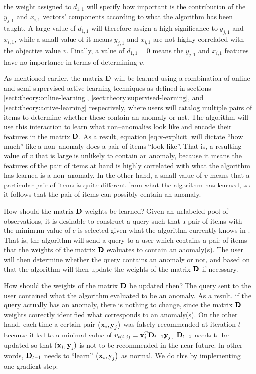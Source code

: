 the weight assigned to $d_{1,1}$ will specify how important is the contribution of the $y_{j,1}$ and $x_{i,1}$ vectors' components according to what the \mlblink algorithm has been taught. A large value of $d_{1,1}$ will therefore assign a high significance to $y_{j,1}$ and $x_{i,1}$, while a small value of it means $y_{j,1}$ and $x_{i,1}$ are not highly correlated with the objective value $v$. Finally, a value of $d_{1,1} = 0$ means the $y_{j,1}$ and $x_{i,1}$ features have no importance in terms of determining $v$.  \newline

As mentioned earlier, the matrix $\boldsymbol{\mathbf{D}}$ will be learned using a combination of online and semi-supervised active learning techniques as defined in sections \ref{sect:theory:online-learning}, \ref{sect:theory:supervised-learning}, and \ref{sect:theory:active-learning} respectively, where users will catalog multiple pairs of items to determine whether these contain an anomaly or not. The \mlblink algorithm will use this interaction to learn what non--anomalies look like and encode their features in the matrix $\boldsymbol{\mathbf{D}}$. As a result, equation \ref{eq:v-explicit} will dictate ``how much'' like a non--anomaly does a pair of items ``look like''. That is, a resulting value of $v$ that is large is unlikely to contain an anomaly, because it means the features of the pair of items at hand is highly correlated with what the \mlblink algorithm has learned is a non--anomaly. In the other hand, a small value of $v$ means that a particular pair of items is quite different from what the \mlblink algorithm has learned, so it follows that the pair of items can possibly contain an anomaly.  \newline

How should the matrix $\boldsymbol{\mathbf{D}}$ weights be learned? Given an unlabeled pool of observations, it is desirable to construct a query such that a pair of items with the minimum value of $v$ is selected given what the \mlblink algorithm currently knows in . That is, the \mlblink algorithm will send a query to a user which contains a pair of items that the weights of the matrix $\boldsymbol{\mathbf{D}}$ evaluates to contain an anomaly(s). The user will then determine whether the query contains an anomaly or not, and based on that the \mlblink algorithm will then update the weights of the matrix $\boldsymbol{\mathbf{D}}$ if necessary.  \newline

How should the weights of the matrix $\boldsymbol{\mathbf{D}}$ be updated then? The query sent to the user contained what the \mlblink algorithm evaluated to be an anomaly. As a result, if the query actually has an anomaly, there is nothing to change, since the matrix $\boldsymbol{\mathbf{D}}$ weights correctly identified what corresponds to an anomaly(s). On the other hand, each time a certain pair $\left( \boldsymbol{\mathbf{x}}_i, \boldsymbol{\mathbf{y}}_j \right)$ was falsely recommended at iteration $t$ because it led to a minimal value of $v_{t \left(i, j \right)} = \boldsymbol{\mathbf{x}}_i^T\boldsymbol{\mathbf{D}}_{t-1} \boldsymbol{\mathbf{y}}_j$, $\boldsymbol{\mathbf{D}}_{t-1}$ needs to be updated so that $(\boldsymbol{\mathbf{x}}_i, \boldsymbol{\mathbf{y}}_j)$ is not to be recommended in the near future. In other words, $\boldsymbol{\mathbf{D}}_{t-1}$ needs to ``learn''  $\left( \boldsymbol{\mathbf{x}}_i, \boldsymbol{\mathbf{y}}_j \right)$ as normal. We do this by implementing one gradient step:


